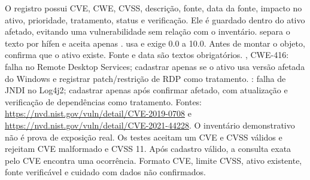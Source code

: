 
 O registro possui CVE, CWE, CVSS, descrição, fonte, data da fonte, impacto no ativo, prioridade, tratamento, status e verificação. Ele é guardado dentro do ativo afetado, evitando uma vulnerabilidade sem relação com o inventário.
  separa o texto por hífen e aceita apenas .  usa  e exige 0.0 a 10.0. Antes de montar o objeto,  confirma que o ativo existe. Fonte e data são textos obrigatórios.
 , CWE-416: falha no Remote Desktop Services; cadastrar apenas se o ativo usa versão afetada do Windows e registrar patch/restrição de RDP como tratamento. : falha de JNDI no Log4j2; cadastrar apenas após confirmar  afetado, com atualização e verificação de dependências como tratamento. Fontes: \url{https://nvd.nist.gov/vuln/detail/CVE-2019-0708} e \url{https://nvd.nist.gov/vuln/detail/CVE-2021-44228}. O inventário demonstrativo não é prova de exposição real.
 Os testes aceitam um CVE e CVSS válidos e rejeitam CVE malformado e CVSS 11. Após cadastro válido, a consulta exata pelo CVE encontra uma ocorrência.
 Formato CVE, limite CVSS, ativo existente, fonte verificável e cuidado com dados não confirmados.

